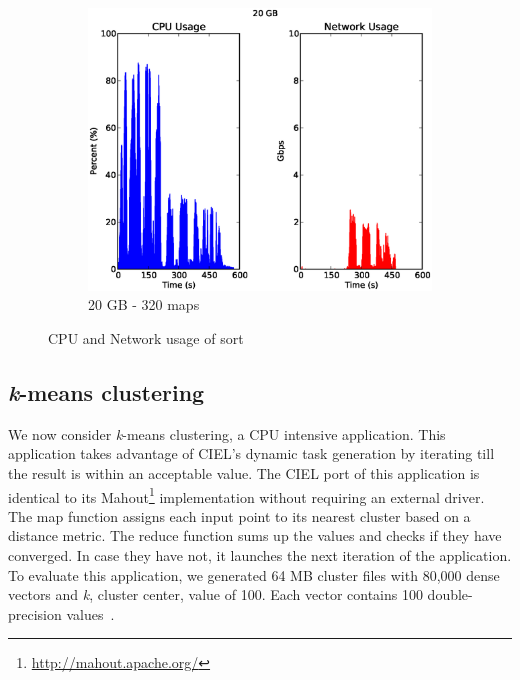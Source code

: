 \documentclass[a4paper,12pt,twoside,openright]{report}
\begin{document}
\begin{figure}[h!]
\begin{subfigure}[b]{0.33\textwidth}
                \label{fig:10GBsortres}
        \end{subfigure}
        \begin{subfigure}[b]{0.33\textwidth}
                \centering
                \includegraphics[width=\textwidth]{320maps.csv.eps}
                \caption{20 GB - 320 maps}
                \label{fig:20GBsortres}
        \end{subfigure}
        \caption{CPU and Network usage of sort}
        \label{chap:eval:sec:ciel:fig:sortres}
\end{figure}

\subsection{\emph{k}-means clustering}
We now consider \emph{k}-means clustering, a CPU intensive application. This
application takes advantage of CIEL's dynamic task generation by iterating till
the result is within an acceptable value. The CIEL port of this application is
identical to its Mahout\footnote{\url{http://mahout.apache.org/}} implementation
without requiring an external driver. The map function assigns each input point
to its nearest cluster based on a distance metric. The reduce function sums up
the values and checks if they have converged. In case they have not, it launches
the next iteration of the application. To evaluate this application, we
generated 64 MB cluster files with 80,000 dense vectors and \emph{k}, cluster
center, value of 100. Each vector contains 100 double-precision
values~\cite{Murray:2011:CUE}.
\end{document}
